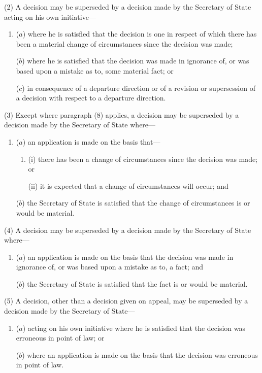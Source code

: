 \documentclass[a4paper,12pt]{article}
\begin{document}
(2) A decision may be superseded by a decision made by the Secretary of State acting on his own initiative---
\begin{enumerate}\item[]
($a$) where he is satisfied that the decision is one in respect of which there has been a material change of circumstances since the decision was made;

($b$) where he is satisfied that the decision was made in ignorance of, or was based upon a mistake as to, some material fact; or

($c$) in consequence of a departure direction or of a revision or supersession of a decision with respect to a departure direction.
\end{enumerate}

(3) Except where paragraph (8) applies, a decision may be superseded by a decision made by the Secretary of State where---
\begin{enumerate}\item[]
($a$) an application is made on the basis that---
\begin{enumerate}\item[]
(i) there has been a change of circumstances since the decision was made; or

(ii) it is expected that a change of circumstances will occur; and
\end{enumerate}

($b$) the Secretary of State is satisfied that the change of circumstances is or would be material.
\end{enumerate}

(4) A decision may be superseded by a decision made by the Secretary of State where---
\begin{enumerate}\item[]
($a$) an application is made on the basis that the decision was made in ignorance of, or was based upon a mistake as to, a fact; and

($b$) the Secretary of State is satisfied that the fact is or would be material.
\end{enumerate}

(5) A decision, other than a decision given on appeal, may be superseded by a decision made by the Secretary of State---
\begin{enumerate}\item[]
($a$) acting on his own initiative where he is satisfied that the decision was erroneous in point of law; or

($b$) where an application is made on the basis that the decision was erroneous in point of law.
\end{enumerate}
\end{document}
